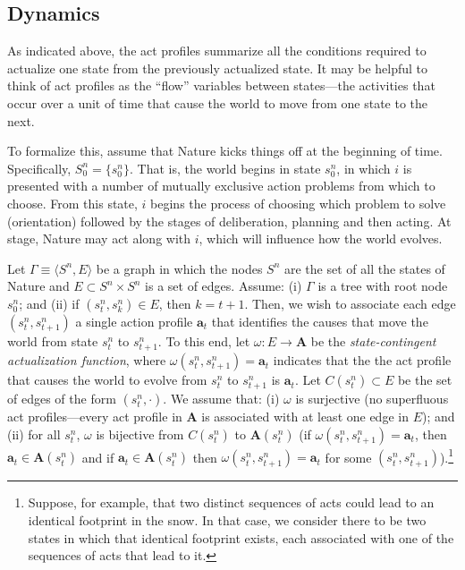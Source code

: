 \documentclass[
11pt,
titlepage,
reqno,
]{article}%
\theoremstyle{definition}
\begin{document}
\subsection{Dynamics} 

As indicated above, the act profiles summarize all the conditions required to actualize one state from the previously actualized state. 
It may be helpful to think of act profiles as the ``flow'' variables between states---the activities that occur over a unit of time that cause the world to move from one state to the next.

To formalize this, assume that Nature kicks things off at the beginning of time.
Specifically, $S^n_0=\{s^n_0\}$.
That is, the world begins in state $s^n_0$, in which $i$ is presented with a number of mutually exclusive action problems from which to choose.
From this state, $i$ begins the process of choosing which problem to solve (orientation) followed by the stages of deliberation, planning and then acting.
At stage, Nature may act along with $i$, which will influence how the world evolves.

Let $\Gamma\equiv\langle S^n,E\rangle$ be a graph in which the nodes $S^n$ are the set of all the states of Nature and $E\subset S^n\times S^n$ is a set of edges.
Assume: (i) $\Gamma$ is a tree with root node $s^n_0$; and (ii) if $(s^n_t,s^n_k)\in E$, then $k=t+1$.
Then, we wish to associate each edge $(s^n_t,s^n_{t+1})$ a single action profile  $\mathbf{a}_t$ that identifies the causes that move the world from state $s^n_t$ to $s^n_{t+1}$.
To this end, let $\omega :E\rightarrow\mathbf{A}$ be the \textit{state-contingent actualization function}, where $\omega (s^n_t,s^n_{t+1})=\mathbf{a}_t$ indicates that the the act profile that causes the world to evolve from $s^n_t$ to $s^n_{t+1}$ is $\mathbf{a}_t$.
Let $C(s^n_t)\subset E$ be the set of edges of the form $(s^n_t,\cdot)$.
We assume that: (i) $\omega$ is surjective (no superfluous act profiles---every act profile in $\mathbf{A}$ is associated with at least one edge in $E$); and (ii)  for all $s^n_t$, $\omega$ is bijective from $C(s^n_t)$ to $\mathbf{A}(s^n_t)$ (if $\omega (s^n_t,s^n_{t+1})=\mathbf{a}_t$, then $\mathbf{a}_t\in\mathbf{A}(s^n_t)$ and if $\mathbf{a}_t\in\mathbf{A}(s^n_t)$ then $\omega (s^n_t,s^n_{t+1})=\mathbf{a}_t$ for some $(s^n_t,s^n_{t+1})$).\footnote
{
	Suppose, for example, that two distinct sequences of acts could lead to an identical footprint in the snow.
	In that case, we consider there to be two states in which that identical footprint exists, each associated with one of the sequences of acts that lead to it.
}
\end{document}
